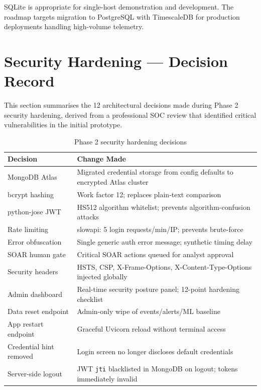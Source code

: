 \documentclass[12pt,a4paper]{article}
\begin{document}
\begin{warnbox}
SQLite is appropriate for single-host demonstration and development.
The roadmap targets migration to PostgreSQL with TimescaleDB for
production deployments handling high-volume telemetry.
\end{warnbox}

\section{Security Hardening — Decision Record}

This section summarises the 12 architectural decisions made during Phase 2 security hardening,
derived from a professional SOC review that identified critical vulnerabilities in the initial prototype.

\begin{table}[H]
\centering
\begin{tabularx}{\linewidth}{lX}
\toprule
\textbf{Decision} & \textbf{Change Made} \\
\midrule
MongoDB Atlas & Migrated credential storage from config defaults to encrypted Atlas cluster \\
bcrypt hashing & Work factor 12; replaces plain-text comparison \\
python-jose JWT & HS512 algorithm whitelist; prevents algorithm-confusion attacks \\
Rate limiting & slowapi: 5 login requests/min/IP; prevents brute-force \\
Error obfuscation & Single generic auth error message; synthetic timing delay \\
SOAR human gate & Critical SOAR actions queued for analyst approval \\
Security headers & HSTS, CSP, X-Frame-Options, X-Content-Type-Options injected globally \\
Admin dashboard & Real-time security posture panel; 12-point hardening checklist \\
Data reset endpoint & Admin-only wipe of events/alerts/ML baseline \\
App restart endpoint & Graceful Uvicorn reload without terminal access \\
Credential hint removed & Login screen no longer discloses default credentials \\
Server-side logout & JWT \texttt{jti} blacklisted in MongoDB on logout; tokens immediately invalid \\
\bottomrule
\end{tabularx}
\caption{Phase 2 security hardening decisions}
\end{table}
\end{document}
